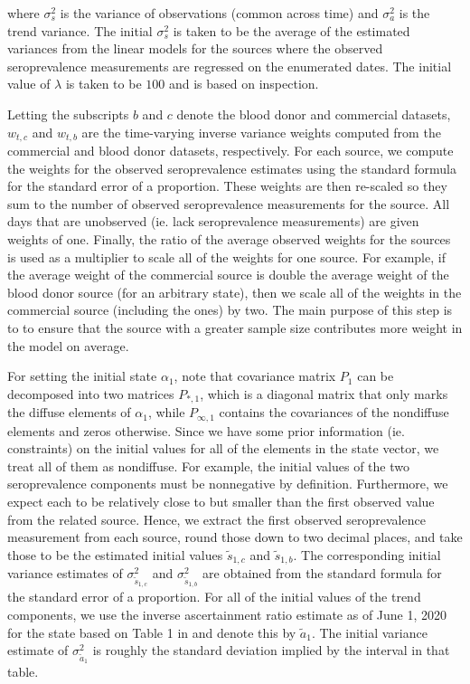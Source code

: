 \documentclass{article}
\begin{document}
where $\sigma^2_s$ is the variance of observations (common across time) and $\sigma^2_a$ is the trend variance. The initial $\sigma^2_s$ is taken to be the average of the estimated variances from the linear models for the sources where the observed seroprevalence measurements are regressed on the enumerated dates. The initial value of $\lambda$ is taken to be $100$ and is based on inspection. 

Letting the subscripts $b$ and $c$ denote the blood donor and commercial datasets, $w_{t,c}$ and $w_{t,b}$ are the time-varying inverse variance weights computed from the commercial and blood donor datasets, respectively. For each source, we compute the weights for the observed seroprevalence estimates using the standard formula for the standard error of a proportion. These weights are then re-scaled so they sum to the number of observed seroprevalence measurements for the source. All days that are unobserved (ie. lack seroprevalence measurements) are given weights of one. Finally, the ratio of the average observed weights for the sources is used as a multiplier to scale all of the weights for one source. For example, if the average weight of the commercial source is double the average weight of the blood donor source (for an arbitrary state), then we scale all of the weights in the commercial source (including the ones) by two. The main purpose of this step is to to ensure that the source with a greater sample size contributes more weight in the model on average. %

For setting the initial state $\alpha_1$, note that covariance matrix $P_1$ can be decomposed into two matrices $P_{*, 1}$, which is a diagonal matrix that only marks the diffuse elements of $\alpha_1$, while $P_{\infty, 1}$ contains the covariances of the nondiffuse elements and zeros otherwise.  Since we have some prior information (ie. constraints) on the initial values for all of the elements in the state vector, we treat all of them as nondiffuse. For example, the initial values of the two seroprevalence components must be nonnegative by definition. Furthermore, we expect each to be relatively close to but smaller than the first observed value from the related source. Hence, we extract the first observed seroprevalence measurement from each source, round those down to two decimal places, and take those to be the estimated initial values $\tilde{s}_{1,c}$ and
$\tilde{s}_{1,b}$. The corresponding initial variance estimates of $\sigma^2_{\tilde{s}_{1,c}}$ and $\sigma^2_{\tilde{s}_{1,b}}$ are obtained from the standard formula for the standard error of a proportion. For all of the initial values of the trend components, we use the inverse ascertainment ratio estimate as of June 1, 2020 for the state based on Table 1 in \citet{unwin2020state} and denote this by $\tilde{a}_1$. The initial variance estimate of $\sigma^2_{\tilde{a}_1}$ is roughly the standard deviation implied by the interval in that table.  %
\end{document}
